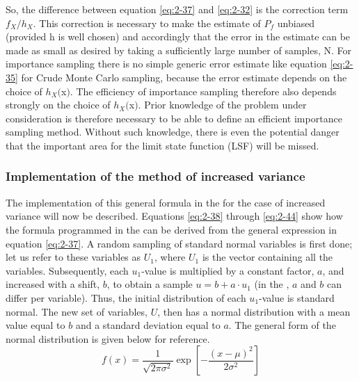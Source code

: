 So, the difference between equation \eqref{eq:2-37} and \eqref{eq:2-32} is the correction term $f_X/h_X$. This correction is necessary to make the estimate of $P_f$ unbiased (provided h is well chosen) and accordingly that the error in the estimate can be made as small as desired by taking a sufficiently large number of samples, N. For importance sampling there is no simple generic error estimate like equation \eqref{eq:2-35} for Crude Monte Carlo sampling, because the error estimate depends on the choice of $h_X($x$)$. The efficiency of importance sampling therefore also depends strongly on the choice of $h_X($x$)$. Prior knowledge of the problem under consideration is therefore necessary to be able to define an efficient importance sampling method. Without such knowledge, there is even the potential danger that the important area for the limit state function (LSF) will be missed. 

\subsubsection{Implementation of the method of increased variance}\label{Section_2.3.4.2}
The implementation of this general formula in the \probLib for the case of increased variance will now be described. Equations \eqref{eq:2-38} through \eqref{eq:2-44} show how the formula programmed in the \probLib can be derived from the general expression in equation \eqref{eq:2-37}. A random sampling of standard normal variables is first done; let us refer to these variables as $U_1$, where $U_1$ is the vector containing all the variables. Subsequently, each $u_1$-value is multiplied by a constant factor, $a$, and increased with a shift, $b$, to obtain a sample $u = b+a \cdot u_1$ (in the \probLib, $a$ and $b$ can differ per variable). Thus, the initial distribution of each $u_1$-value is standard normal. The new set of variables, $U$, then has a normal distribution with a mean value equal to $b$ and a standard deviation equal to $a$. The general form of the normal distribution is given below for reference. 
\begin{equation}
f\left(x\right)=\frac{1}{\sqrt{2\pi \sigma ^{2} } } \exp \left[-\frac{\left(x-\mu \right)^{2} }{2\sigma ^{2} } \right] \label{eq:2-38} 
\end{equation}

